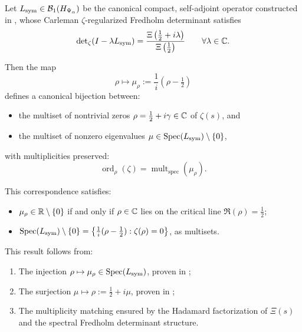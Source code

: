 \begin{theorem}
\label{thm:spectral_zero_bijection_revised}
Let \( L_{\mathrm{sym}} \in \mathcal{B}_1(H_{\Psi_\alpha}) \) be the canonical compact, self-adjoint operator constructed in , whose Carleman \(\zeta\)-regularized Fredholm determinant satisfies
\[
\det\nolimits_{\zeta}(I - \lambda L_{\mathrm{sym}}) = \frac{\Xi\left(\tfrac{1}{2} + i\lambda\right)}{\Xi\left(\tfrac{1}{2}\right)} \qquad \forall \lambda \in \mathbb{C}.
\]

Then the map
\[
\rho \longmapsto \mu_\rho := \frac{1}{i}(\rho - \tfrac{1}{2})
\]
defines a canonical bijection between:
\begin{itemize}
  \item the multiset of nontrivial zeros \( \rho = \tfrac{1}{2} + i\gamma \in \mathbb{C} \) of \( \zeta(s) \), and
  \item the multiset of nonzero eigenvalues \( \mu \in \operatorname{Spec}(L_{\mathrm{sym}}) \setminus \{0\} \),
\end{itemize}
with multiplicities preserved:
\[
\operatorname{ord}_\rho(\zeta) = \operatorname{mult}_{\mathrm{spec}}(\mu_\rho).
\]

\medskip

\noindent
This correspondence satisfies:
\begin{itemize}
  \item \( \mu_\rho \in \mathbb{R} \setminus \{0\} \) if and only if \( \rho \in \mathbb{C} \) lies on the critical line \( \Re(\rho) = \tfrac{1}{2} \);
  \item \( \operatorname{Spec}(L_{\mathrm{sym}}) \setminus \{0\} = \left\{ \tfrac{1}{i}(\rho - \tfrac{1}{2}) : \zeta(\rho) = 0 \right\} \), as multisets.
\end{itemize}

\medskip

\noindent
This result follows from:
\begin{enumerate}
  \item The injection \( \rho \mapsto \mu_\rho \in \operatorname{Spec}(L_{\mathrm{sym}}) \), proven in ;
  \item The surjection \( \mu \mapsto \rho := \tfrac{1}{2} + i\mu \), proven in ;
  \item The multiplicity matching ensured by the Hadamard factorization of \( \Xi(s) \) and the spectral Fredholm determinant structure.
\end{enumerate}
\end{theorem}
